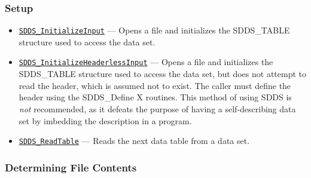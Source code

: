 \documentclass[11pt]{article}
\newcommand{\progref}[1]{\hyperref[SDDS_#1]{\tt SDDS\_#1}}
\begin{document}
\subsubsection{Setup}

\begin{itemize}
\item \progref{InitializeInput} --- Opens a file and initializes the SDDS\_TABLE structure used to access the data set.
\item \progref{InitializeHeaderlessInput} --- Opens a file and initializes the SDDS\_TABLE structure used to access the data set, but does not attempt to read the header, which is assumed not to exist. The caller must define the header using the SDDS\_Define X routines. This method of using SDDS is {\em not} recommended, as it defeats the purpose of having a self-describing data set by imbedding the description in a program.
\item \progref{ReadTable} --- Reads the next data table from a data set. 
\end{itemize}

\subsubsection{Determining File Contents}
\end{document}
